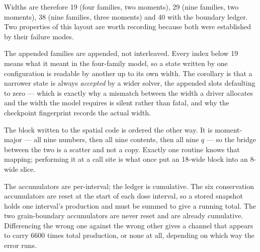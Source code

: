 Widths are therefore 19 (four families, two moments), 29 (nine families, two
moments), 38 (nine families, three moments) and 40 with the boundary ledger.
Two properties of this layout are worth recording because both were established
by their failure modes.

The appended families are appended, not interleaved. Every index below
19 means what it meant in the four-family model, so a state written by one
configuration is readable by another up to its own width. The corollary is that
a narrower state is always \emph{accepted} by a wider solver, the appended slots
defaulting to zero --- which is exactly why a mismatch between the width a driver
allocates and the width the model requires is silent rather than fatal, and why
the checkpoint fingerprint records the actual width.

The block written to the spatial code is ordered the other way. It is
moment-major --- all nine numbers, then all nine contents, then all nine $q$ ---
so the bridge between the two is a scatter and not a copy. Exactly one routine
knows that mapping; performing it at a call site is what once put an 18-wide
block into an 8-wide slice.

The accumulators are per-interval; the ledger is cumulative. The six
conservation accumulators are reset at the start of each dose interval, so a
stored snapshot holds one interval's production and must be summed to give a
running total. The two grain-boundary accumulators are never reset and are
already cumulative. Differencing the wrong one against the wrong other gives a
channel that appears to carry $6600$ times total production, or none at all,
depending on which way the error runs.
